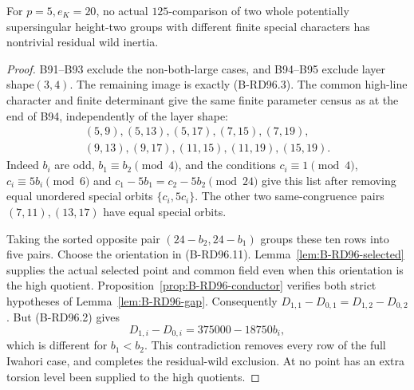 \begin{theorem}
\label{thm:B-RD96-residual-wild}
For $p=5,e_K=20$, no actual $125$-comparison of two whole
potentially supersingular height-two groups with different finite
special characters has nontrivial residual wild inertia.
\end{theorem}
\begin{proof}
B91--B93 exclude the non-both-large cases, and B94--B95 exclude
layer shape$(3,4)$. The remaining image is exactly (B-RD96.3).
The common high-line character and finite determinant give the
same finite parameter census as at the end of B94, independently
of the layer shape:
\[
\begin{gathered}
 (5,9),(5,13),(5,17),(7,15),(7,19),\\
 (9,13),(9,17),(11,15),(11,19),(15,19).
\end{gathered}                                          \tag{B-RD96.18}
\]
Indeed $b_i$ are odd, $b_1\equiv b_2\pmod4$, and the conditions
$c_i\equiv1\pmod4$, $c_i\equiv5b_i\pmod6$ and
$c_1-5b_1=c_2-5b_2\pmod {24}$ give this list after removing
equal unordered special orbits $\{c_i,5c_i\}$. The other two
same-congruence pairs $(7,11),(13,17)$ have equal special orbits.

Taking the sorted opposite pair $(24-b_2,24-b_1)$ groups these
ten rows into five pairs. Choose the orientation in (B-RD96.11).
Lemma~\ref{lem:B-RD96-selected} supplies the actual selected
point and common field even when this orientation is the high
quotient. Proposition~\ref{prop:B-RD96-conductor} verifies
both strict hypotheses of Lemma~\ref{lem:B-RD96-gap}.
Consequently $D_{1,1}-D_{0,1}=D_{1,2}-D_{0,2}$. But (B-RD96.2)
gives
\[
              D_{1,i}-D_{0,i}=375000-18750b_i,
                                                        \tag{B-RD96.19}
\]
which is different for $b_1<b_2$. This contradiction removes
every row of the full Iwahori case, and completes the residual-wild
exclusion. At no point has an extra torsion level been supplied
to the high quotients.
\end{proof}

